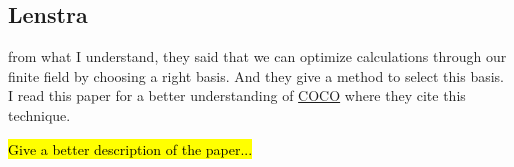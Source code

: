 \subsection{Lenstra}
\cite{lenstra_guide} from what I understand, they said that we can optimize calculations through our finite field by choosing a right basis. And they give a method to select this basis. I read this paper for a better understanding of \hyperref[sec:COCO]{COCO} where they cite this technique.

\hl{Give a better description of the paper...}